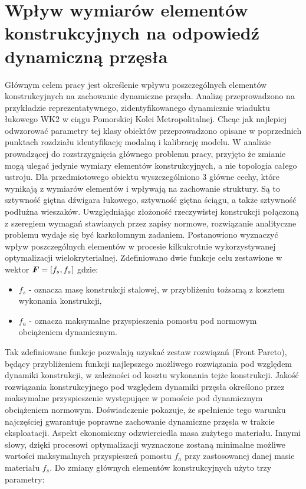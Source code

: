 \section{Wpływ wymiarów elementów konstrukcyjnych na odpowiedź dynamiczną przęsła}
Głównym celem pracy jest określenie wpływu poszczególnych elementów konstrukcyjnych na zachowanie dynamiczne przęsła. Analizę przeprowadzono na przykładzie reprezentatywnego, zidentyfikowanego dynamicznie wiaduktu łukowego WK2 w ciągu Pomorskiej Kolei Metropolitalnej. Chcąc jak najlepiej odwzorować parametry tej klasy obiektów przeprowadzono opisane w poprzednich punktach rozdziału identyfikację modalną i kalibrację modelu. W analizie prowadzącej do rozstrzygnięcia głównego problemu pracy, przyjęto że zmianie mogą ulegać jedynie wymiary elementów konstrukcyjnych, a nie topologia całego ustroju. Dla przedmiotowego obiektu wyszczególniono 3 główne cechy, które wynikają z wymiarów elementów i wpływają na zachowanie struktury. Są to sztywność giętna dźwigara łukowego, sztywność giętna ściągu, a także sztywność podłużna wieszaków. Uwzględniając złożoność rzeczywistej konstrukcji połączoną z szeregiem wymagań stawianych przez zapisy normowe, rozwiązanie analityczne problemu wydaje się być karkołomnym zadaniem. Postanowiono wyznaczyć wpływ poszczególnych elementów w procesie kilkukrotnie wykorzystywanej optymalizacji wielokryterialnej. Zdefiniowano dwie funkcje celu zestawione w wektor $\bm{F}=[f_s,f_a]$ gdzie:
\begin{itemize}
	\item $f_s$ - oznacza masę konstrukcji stalowej, w przybliżeniu tożsamą z kosztem wykonania konstrukcji,
	\item $f_a$ - oznacza maksymalne przyspieszenia pomostu pod normowym obciążeniem dynamicznym.
\end{itemize}
Tak zdefiniowane funkcje pozwalają uzyskać zestaw rozwiązań (Front Pareto), będący przybliżeniem funkcji najlepszego możliwego rozwiązania pod względem dynamiki konstrukcji, w zależności od kosztu wykonania tejże konstrukcji. Jakość rozwiązania konstrukcyjnego pod względem dynamiki przęsła określono przez maksymalne przyspieszenie występujące w pomoście pod dynamicznym obciążeniem normowym. Doświadczenie pokazuje, że spełnienie tego warunku najczęściej gwarantuje poprawne zachowanie dynamiczne przęsła w trakcie eksploatacji. Aspekt ekonomiczny odzwierciedla masa zużytego materiału. Innymi słowy, dzięki procesowi optymalizacji wyznaczone zostaną minimalne możliwe wartości maksymalnych przyspieszeń pomostu $f_a$ przy zastosowanej danej masie materiału $f_s$. Do zmiany głównych elementów konstrukcyjnych użyto trzy parametry:
